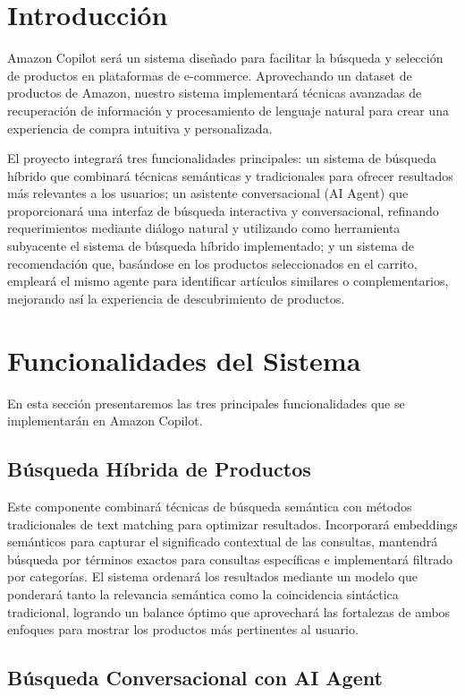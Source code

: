 \documentclass[12pt]{article}
\begin{document}
\section{Introducción}
Amazon Copilot será un sistema diseñado para facilitar la búsqueda y selección de productos en plataformas de e-commerce. Aprovechando un dataset de productos de Amazon, nuestro sistema implementará técnicas avanzadas de recuperación de información y procesamiento de lenguaje natural para crear una experiencia de compra intuitiva y personalizada.

El proyecto integrará tres funcionalidades principales: un sistema de búsqueda híbrido que combinará técnicas semánticas y tradicionales para ofrecer resultados más relevantes a los usuarios; un asistente conversacional (AI Agent) que proporcionará una interfaz de búsqueda interactiva y conversacional, refinando requerimientos mediante diálogo natural y utilizando como herramienta subyacente el sistema de búsqueda híbrido implementado; y un sistema de recomendación que, basándose en los productos seleccionados en el carrito, empleará el mismo agente para identificar artículos similares o complementarios, mejorando así la experiencia de descubrimiento de productos.

\section{Funcionalidades del Sistema}

En esta sección presentaremos las tres principales funcionalidades que se implementarán en Amazon Copilot.

\subsection{Búsqueda Híbrida de Productos}

Este componente combinará técnicas de búsqueda semántica con métodos tradicionales de text matching para optimizar resultados. Incorporará embeddings semánticos para capturar el significado contextual de las consultas, mantendrá búsqueda por términos exactos para consultas específicas e implementará filtrado por categorías. El sistema ordenará los resultados mediante un modelo que ponderará tanto la relevancia semántica como la coincidencia sintáctica tradicional, logrando un balance óptimo que aprovechará las fortalezas de ambos enfoques para mostrar los productos más pertinentes al usuario.

\subsection{Búsqueda Conversacional con AI Agent}
\end{document}
